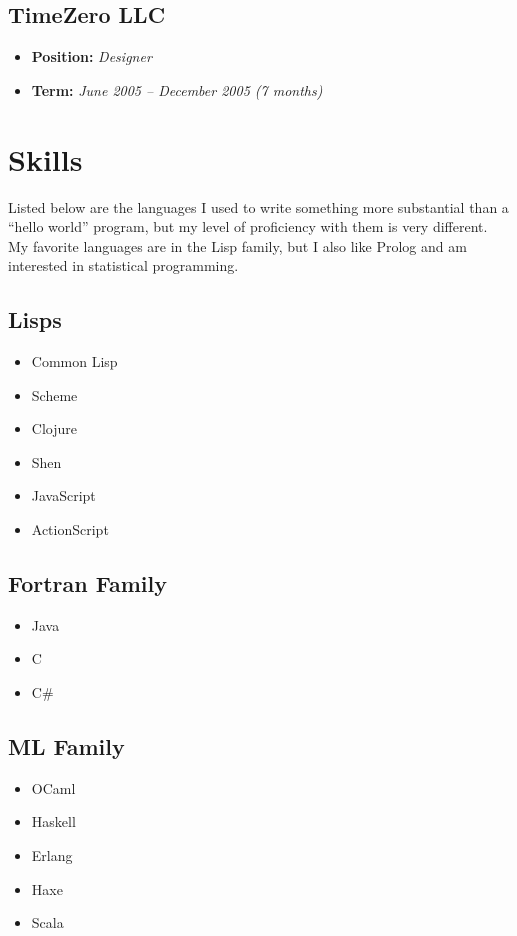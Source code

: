 \documentclass[11pt]{article}
\begin{document}
\subsection{TimeZero LLC}
\label{sec-2-8}
\begin{itemize}
\item \textbf{Position:} \emph{Designer}
\item \textbf{Term:} \emph{June 2005 – December 2005 (7 months)}
\end{itemize}
\section{Skills}
\label{sec-3}
Listed below are the languages I used to write something more substantial
than a ``hello world'' program, but my level of proficiency with them is
very different.  My favorite languages are in the Lisp family, but I also
like Prolog and am interested in statistical programming.

\subsection{Lisps}
\label{sec-3-1}
\begin{itemize}
\item Common Lisp
\item Scheme
\item Clojure
\item Shen
\item JavaScript
\item ActionScript
\end{itemize}
\subsection{Fortran Family}
\label{sec-3-2}
\begin{itemize}
\item Java
\item C
\item C\#
\end{itemize}
\subsection{ML Family}
\label{sec-3-3}
\begin{itemize}
\item OCaml
\item Haskell
\item Erlang
\item Haxe
\item Scala
\end{itemize}
\end{document}
